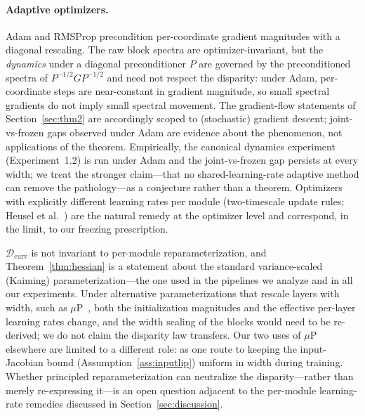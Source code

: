 \paragraph{Adaptive optimizers.}
Adam and RMSProp precondition per-coordinate gradient magnitudes with
a diagonal rescaling. The raw block spectra are
optimizer-invariant, but the \emph{dynamics} under a diagonal
preconditioner $P$ are governed by the preconditioned spectra of
$P^{-1/2} G P^{-1/2}$ and need not respect the disparity: under
Adam, per-coordinate steps are near-constant in gradient magnitude,
so small spectral gradients do not imply small spectral movement.
The gradient-flow statements of Section~\ref{sec:thm2} are
accordingly scoped to (stochastic) gradient descent; joint-vs-frozen
gaps observed under Adam are evidence about the phenomenon, not
applications of the theorem. Empirically, the
canonical dynamics experiment (Experiment~1.2) is run under Adam and
the joint-vs-frozen gap persists at every width; we treat the stronger
claim---that no shared-learning-rate adaptive method can remove the
pathology---as a conjecture rather than a theorem. Optimizers with
explicitly different learning rates per module (two-timescale update
rules; Heusel et al.~\cite{heusel2017gans}) are the natural remedy at
the optimizer level and correspond, in the limit, to our freezing
prescription.

\begin{remark}
\label{rem:param_scope}
$\mathcal{D}_{\mathrm{curv}}$ is not invariant to per-module
reparameterization, and Theorem~\ref{thm:hessian} is a statement
about the standard variance-scaled (Kaiming) parameterization---the
one used in the pipelines we analyze and in all our experiments.
Under alternative parameterizations that rescale layers with width,
such as $\mu$P~\cite{yang2021tensor}, both the initialization
magnitudes and the effective per-layer learning rates change, and
the width scaling of the blocks would need to be re-derived; we do
not claim the disparity law transfers. Our two uses of $\mu$P
elsewhere are limited to a different role: as one route to keeping
the input-Jacobian bound (Assumption~\ref{ass:inputlip}) uniform in
width during training. Whether principled reparameterization can
neutralize the disparity---rather than merely re-expressing it---is
an open question adjacent to the per-module learning-rate remedies
discussed in Section~\ref{sec:discussion}.
\end{remark}

